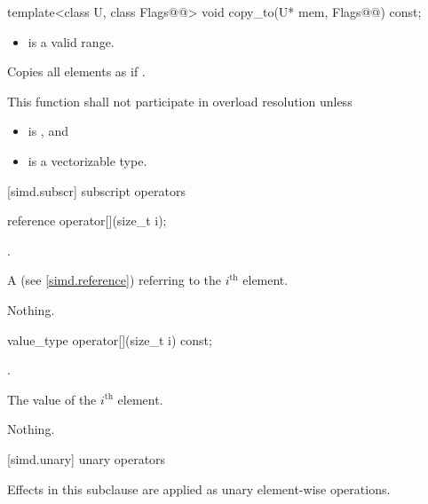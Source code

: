 \begin{itemdecl}
template<class U, class Flags@@> void copy_to(U* mem, Flags@\wgAdd{ = \{\}}@) const;
\end{itemdecl}

\begin{itemdescr}
  \pnum\requires
  \begin{itemize}
    \item \tcode{[mem, mem + size())} is a valid range.
  \end{itemize}

  \pnum\effects
  Copies all  elements as if  \foralli.

  \pnum\remarks
  This function shall not participate in overload resolution unless
  \begin{itemize}
    \item {} is , and
    \item {} is a vectorizable type.
  \end{itemize}
\end{itemdescr}

[simd.subscr]{ subscript operators}

\begin{itemdecl}
reference operator[](size_t i);
\end{itemdecl}

\begin{itemdescr}
  \pnum\requires
  .

  \pnum\returns
  A  (see \ref{simd.reference}) referring to the $i^\text{th}$ element.

  \pnum\throws Nothing.
\end{itemdescr}

\begin{itemdecl}
value_type operator[](size_t i) const;
\end{itemdecl}

\begin{itemdescr}
  \pnum\requires
  .

  \pnum\returns
  The value of the $i^\text{th}$ element.

  \pnum\throws Nothing.
\end{itemdescr}

[simd.unary]{ unary operators}

\pnum
Effects in this subclause are applied as unary element-wise operations.

